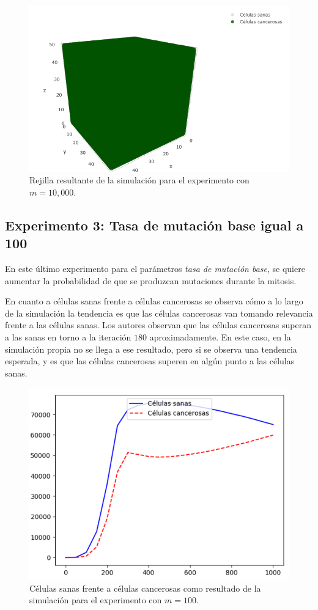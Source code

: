 \begin{figure}[h]
\centering
\includegraphics[scale=0.6]{figures/experiments/exp2/grid}
\caption{Rejilla resultante de la simulación para el experimento con $m = 10,000$.}
\end{figure}

\subsection{Experimento 3: Tasa de mutación base igual a 100}

En este último experimento para el parámetros \textit{tasa de mutación base}, se
quiere aumentar la probabilidad de que se produzcan mutaciones durante la mitosis.

En cuanto a células sanas frente a células cancerosas se observa cómo a lo largo de la simulación la
tendencia es que las células cancerosas van tomando relevancia frente a las células sanas. Los autores
observan que las células cancerosas superan a las sanas en torno a la iteración $180$ aproximadamente.
En este caso, en la simulación propia no se llega a ese resultado, pero si se observa una tendencia esperada,
y es que las células cancerosas superen en algún punto a las células sanas.

\begin{figure}[h]
\centering
\includegraphics[scale=0.8]{figures/experiments/exp3/healthvscarcino}
\caption{Células sanas frente a células cancerosas como resultado de la simulación para el experimento con $m = 100$.}
\end{figure}

